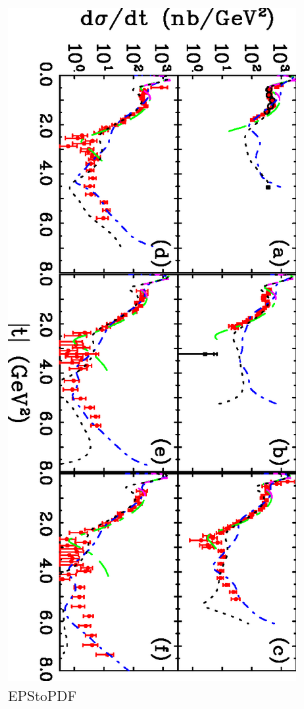 \documentclass[aps,prc,twocolumn,floatfix,showpacs,preprintnumbers,amsmath,amssymb,superscriptaddress,linenumbers]{revtex4-1}
\begin{document}
\begin{figure}[htb!]
\centerline{
        \includegraphics[width=3in, angle=90]{dsdt.eps}}

        \caption {EPStoPDF} 
	\label{fig:t_data}
\end{figure}
\end{document}
